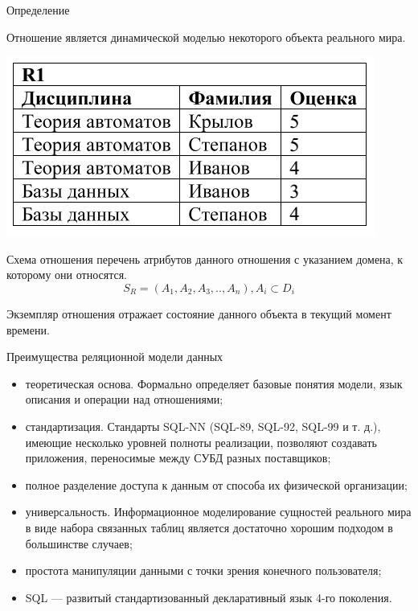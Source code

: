 \documentclass{beamer}
\begin{document}
\begin{frame}{Определение}
\begin{block}{Отношение}
является динамической моделью некоторого объекта реального мира. 
\end{block}
\begin{center}
\includegraphics[scale=0.35]{images/rel-02.png}
\end{center}
\begin{block}{Схема отношения}
перечень атрибутов данного отношения с указанием домена, к которому они относятся. 
\[ S_{R} = (A_{1},A_{2},A_{3},..,A_{n}), A_{i} \subset D_{i} \]
\end{block}
\begin{block}{Экземпляр отношения}
отражает состояние данного объекта в текущий момент времени. 
\end{block}
\end{frame}

\begin{frame}{}
\begin{block}{Преимущества реляционной модели данных}
\begin{itemize}
\item теоретическая основа. Формально определяет базовые понятия
модели, язык описания и операции над отношениями;
\item стандартизация. Стандарты SQL-NN (SQL-89, SQL-92, SQL-99 и
т. д.), имеющие несколько уровней полноты реализации, позволяют
создавать приложения, переносимые между СУБД разных
поставщиков;
\item полное разделение доступа к данным от способа их физической
организации;
\item универсальность. Информационное моделирование сущностей
реального мира в виде набора связанных таблиц является достаточно
хорошим подходом в большинстве случаев;
\item простота манипуляции данными с точки зрения конечного
пользователя;
\item SQL — развитый стандартизованный декларативный язык 4-го
поколения.
\end{itemize}
\end{block}
\end{frame}
\end{document}
